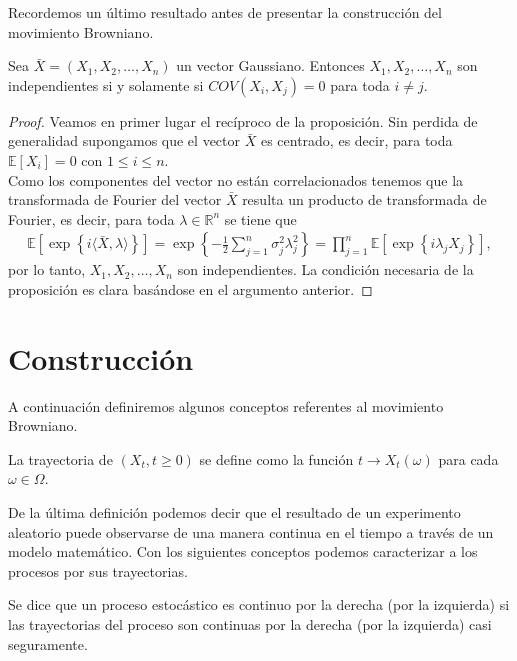 Recordemos un último resultado antes de presentar la construcción del movimiento Browniano.

\begin{proposition} 
\label{cova}
Sea $\bar{X} = (X_1, X_2, \ldots, X_n)$ un vector Gaussiano. Entonces $X_1, X_2, \ldots, X_n$ son independientes si y solamente si $COV(X_i, X_j) = 0$ para toda $i \neq j$.
\end{proposition}
\begin{proof}
Veamos en primer lugar el recíproco de la proposición. Sin perdida de generalidad supongamos que el vector $\bar{X}$ es centrado, es decir, para toda $\mathbb{E}[X_i] = 0$ con $1 \leq i \leq n$. \\

Como los componentes del vector no están correlacionados tenemos que la transformada de Fourier del vector $\bar{X}$ resulta un producto de transformada de Fourier, es decir, para toda $\lambda \in \mathbb{R}^n$ se tiene que
	\begin{align*}
	\mathbb{E} \left[ \exp \left\{ i \langle \bar{X}, \lambda \rangle \right\} \right] = \exp \left\{ - \frac{1}{2} \sum_{j = 1}^{n} \sigma_j^2 \lambda_j^2 \right\} = \prod_{j=1}^{n} \mathbb{E} \left[ \exp \left\{ i \lambda_j X_j \right\} \right],
	\end{align*}
por lo tanto, $X_1, X_2, \ldots, X_n$ son independientes. La condición necesaria de la proposición es clara basándose en el argumento anterior.
\end{proof}

\section{Construcción}
A continuación definiremos algunos conceptos referentes al movimiento Browniano.

\begin{definition}
La trayectoria de $(X_t, t \geq 0)$ se define como la función $t \rightarrow X_t(\omega)$ para cada $\omega \in \Omega$.
\end{definition}

De la última definición podemos decir que el resultado de un experimento aleatorio puede observarse de una manera continua en el tiempo a través de un modelo matemático. Con los siguientes conceptos podemos caracterizar a los procesos por sus trayectorias.

\begin{definition}
Se dice que un proceso estocástico es continuo por la derecha (por la izquierda) si las trayectorias del proceso son continuas por la derecha (por la izquierda) casi seguramente.
\end{definition}

